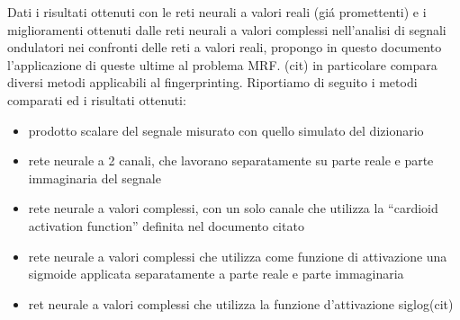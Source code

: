 \documentclass[a4paper,10pt]{article}
\begin{document}
 Dati i risultati ottenuti con le reti neurali a valori reali (gi\'a promettenti) e i miglioramenti ottenuti dalle reti neurali a valori complessi nell'analisi di segnali ondulatori nei confronti delle reti a valori reali, propongo in questo documento l'applicazione di queste ultime al problema MRF. (cit) in particolare compara diversi metodi applicabili al fingerprinting. Riportiamo di seguito i metodi comparati ed i risultati ottenuti:
 \begin{itemize}
  \item prodotto scalare del segnale misurato con quello simulato del dizionario
  \item rete neurale a 2  canali, che lavorano separatamente su parte reale e parte immaginaria del segnale
  \item rete neurale a valori complessi, con un solo canale che utilizza la ``cardioid activation function'' definita nel documento citato
  \item rete neurale a valori complessi che utilizza come funzione di attivazione una sigmoide applicata separatamente a parte reale e parte immaginaria
  \item ret neurale a valori complessi che utilizza la funzione d'attivazione siglog(cit)
 \end{itemize}

 
 
\end{document}
